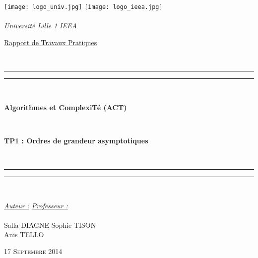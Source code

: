 \thispagestyle{cover}

\texttt{[image: logo\_univ.jpg]} \hfill \texttt{[image: logo\_ieea.jpg]} \\
~\\
\hspace*{0.5cm} {\Large \textit{Université Lille 1}} \hfill {\Large \textit{IEEA}} \hspace*{0.5cm}\\

\vspace*{17mm}

\begin{center}
	\begin{Huge} \underline{Rapport de Travaux Pratiques} \end{Huge}\\[4mm]

	\vspace*{15mm}

	\rule[0.5ex]{\linewidth}{2pt}\vspace*{-\baselineskip}\vspace*{3.2pt}
	\rule[0.5ex]{\linewidth}{1pt}\\[\baselineskip]

		\begin{Huge} \textbf{Algorithmes et ComplexiTé (ACT)} \end{Huge}\\[4mm]
		\begin{Huge} \textbf{TP1 : Ordres de grandeur asymptotiques} \end{Huge}\\[4mm]

	\rule[0.5ex]{\linewidth}{1pt}\vspace*{-\baselineskip}\vspace{3.2pt}
	\rule[0.5ex]{\linewidth}{2pt}\\

	\vspace*{20mm}

	{\large \textit{\underline{Auteur :}}} \hfill {\large \textit{\underline{Professeur :}}}\\
	~\\
	{\large Salla DIAGNE} \hfill {\large Sophie TISON}\\
	{\large Anis TELLO} \hfill {\large}
	
	\vspace*{20mm}
	
	{\large\textsc{17 Septembre 2014}}
\end{center}